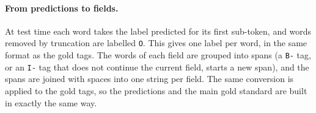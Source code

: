 \paragraph{From predictions to fields.}
At test time each word takes the label predicted for its first sub-token, and words removed by truncation are labelled \texttt{O}. This gives one label per word, in the same format as the gold tags. The words of each field are grouped into spans (a \texttt{B-} tag, or an \texttt{I-} tag that does not continue the current field, starts a new span), and the spans are joined with spaces into one string per field. The same conversion is applied to the gold tags, so the predictions and the main gold standard are built in exactly the same way.
